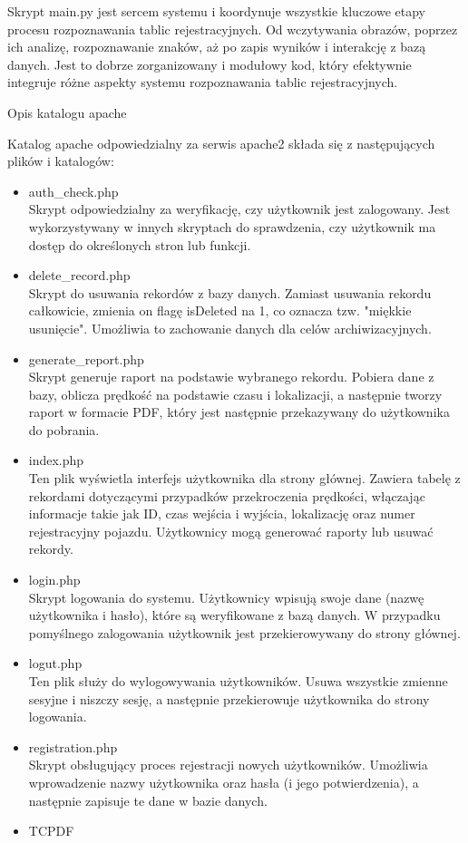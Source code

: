 \documentclass[12pt,a4paper,oneside]{article}
\theoremstyle{definition}
\numberwithin{equation}{section}
\begin{document}
Skrypt main.py jest sercem systemu i koordynuje wszystkie kluczowe etapy procesu rozpoznawania tablic rejestracyjnych. Od wczytywania obrazów, poprzez ich analizę, rozpoznawanie znaków, aż po zapis wyników i interakcję z bazą danych. Jest to dobrze zorganizowany i modułowy kod, który efektywnie integruje różne aspekty systemu rozpoznawania tablic rejestracyjnych.


Opis katalogu apache 

Katalog apache odpowiedzialny za serwis apache2 składa się z następujących plików i katalogów:

\begin{itemize}
  \item auth{\_}check.php \\
Skrypt odpowiedzialny za weryfikację, czy użytkownik jest zalogowany. Jest wykorzystywany w innych skryptach do sprawdzenia, czy użytkownik ma dostęp do określonych stron lub funkcji.  
  \item delete{\_}record.php \\
Skrypt do usuwania rekordów z bazy danych. Zamiast usuwania rekordu całkowicie, zmienia on flagę isDeleted na 1, co oznacza tzw. "miękkie usunięcie". Umożliwia to zachowanie danych dla celów archiwizacyjnych.  
  \item generate{\_}report.php \\
Skrypt generuje raport na podstawie wybranego rekordu. Pobiera dane z bazy, oblicza prędkość na podstawie czasu i lokalizacji, a następnie tworzy raport w formacie PDF, który jest następnie przekazywany do użytkownika do pobrania.  
  \item index.php \\
Ten plik wyświetla interfejs użytkownika dla strony głównej. Zawiera tabelę z rekordami dotyczącymi przypadków przekroczenia prędkości, włączając informacje takie jak ID, czas wejścia i wyjścia, lokalizację oraz numer rejestracyjny pojazdu. Użytkownicy mogą generować raporty lub usuwać rekordy.
  \item login.php \\
Skrypt logowania do systemu. Użytkownicy wpisują swoje dane (nazwę użytkownika i hasło), które są weryfikowane z bazą danych. W przypadku pomyślnego zalogowania użytkownik jest przekierowywany do strony głównej.
  \item logut.php \\
Ten plik służy do wylogowywania użytkowników. Usuwa wszystkie zmienne sesyjne i niszczy sesję, a następnie przekierowuje użytkownika do strony logowania.  
  
  \item registration.php \\
Skrypt obsługujący proces rejestracji nowych użytkowników. Umożliwia wprowadzenie nazwy użytkownika oraz hasła (i jego potwierdzenia), a następnie zapisuje te dane w bazie danych.  
  \item TCPDF
\end{itemize}
\end{document}
